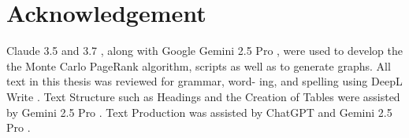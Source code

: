 \section*{Acknowledgement}

Claude 3.5 and 3.7 , along with Google Gemini 2.5 Pro  , were used to
develop the the Monte Carlo PageRank algorithm, scripts as well as to
generate graphs. All text in this thesis was reviewed for grammar, word-
ing, and spelling using DeepL Write . Text Structure such as Headings and
the Creation of Tables were assisted by Gemini 2.5 Pro . Text Production was
assisted by ChatGPT  and Gemini 2.5 Pro . 